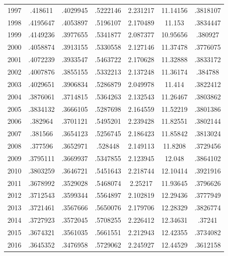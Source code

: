 {\begin{longtable}{l*{1}{cccccc}}
1997        &     .418611&    .4029945&    .5222146&    2.231217&    11.14156&    .3818107\\
1998        &    .4195647&    .4053897&    .5196107&    2.170489&      11.153&    .3834447\\
1999        &    .4149236&    .3977655&    .5341877&    2.087377&    10.95656&     .380927\\
2000        &    .4058874&    .3913155&    .5330558&    2.127146&    11.37478&    .3776075\\
2001        &    .4072239&    .3933547&    .5463722&    2.170628&    11.32888&    .3833172\\
2002        &    .4007876&    .3855155&    .5332213&    2.137248&    11.36174&     .384788\\
2003        &    .4029651&    .3906834&    .5286879&    2.049978&      11.414&    .3822412\\
2004        &    .3876061&    .3714815&    .5364263&    2.132543&    11.26467&    .3803862\\
2005        &    .3834132&    .3666105&    .5287698&    2.164559&    11.52219&    .3801386\\
2006        &     .382964&    .3701121&    .5495201&    2.239428&    11.82551&    .3802144\\
2007        &     .381566&    .3654123&    .5256745&    2.186423&    11.85842&    .3813024\\
2008        &     .377596&    .3652971&     .528448&    2.149113&     11.8208&    .3729456\\
2009        &    .3795111&    .3669937&    .5347855&    2.123945&      12.048&    .3864102\\
2010        &    .3803259&    .3646721&    .5451643&    2.218744&    12.10414&    .3921916\\
2011        &    .3678992&    .3529028&    .5468074&     2.25217&    11.93645&    .3796626\\
2012        &    .3712543&    .3599344&    .5564897&    2.102819&    12.29436&    .3777949\\
2013        &    .3721461&    .3567666&    .5650076&    2.179706&    12.28329&    .3826774\\
2014        &    .3727923&    .3572045&    .5708255&    2.226412&    12.34631&      .37241\\
2015        &    .3674321&    .3561035&    .5661551&    2.212943&    12.42355&    .3734082\\
2016        &    .3645352&    .3476958&    .5729062&    2.245927&    12.44529&    .3612158\\

\end{longtable}}

